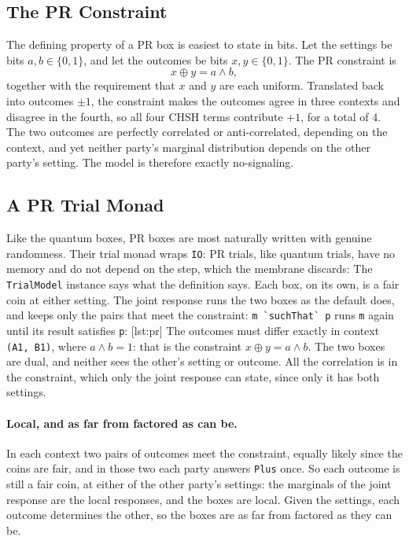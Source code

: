 \documentclass[11pt]{article}
\newcommand{\hs}{\lstinline[style=hask,basicstyle=\ttfamily,frame=none]}
\begin{document}
\subsection{The PR Constraint}

The defining property of a PR box is easiest to state in bits. Let the settings be bits $a, b \in \{0, 1\}$, and let the outcomes be bits $x, y \in \{0, 1\}$. The PR constraint is
\[
  x \oplus y = a \land b,
\]
together with the requirement that $x$ and $y$ are each uniform. Translated back into outcomes $\pm1$, the constraint makes the outcomes agree in three contexts and disagree in the fourth, so all four CHSH terms contribute $+1$, for a total of $4$. The two outcomes are perfectly correlated or anti-correlated, depending on the context, and yet neither party's marginal distribution depends on the other party's setting. The model is therefore exactly no-signaling.

\subsection{A PR Trial Monad}

Like the quantum boxes, PR boxes are most naturally written with genuine randomness. Their trial monad wraps \hs|IO|:
PR trials, like quantum trials, have no memory and do not depend on the step, which the membrane discards:
The \hs|TrialModel| instance says what the definition says. Each box, on its own, is a fair coin at either setting. The joint response runs the two boxes as the default does, and keeps only the pairs that meet the constraint: \hs|m `suchThat` p| runs \hs|m| again until its result satisfies \hs|p|:
[lst:pr]
The outcomes must differ exactly in context \hs|(A1, B1)|, where $a \land b = 1$: that is the constraint $x \oplus y = a \land b$. The two boxes are dual, and neither sees the other's setting or outcome. All the correlation is in the constraint, which only the joint response can state, since only it has both settings.

\paragraph{Local, and as far from factored as can be.} In each context two pairs of outcomes meet the constraint, equally likely since the coins are fair, and in those two each party answers \hs|Plus| once. So each outcome is still a fair coin, at either of the other party's settings: the marginals of the joint response are the local responses, and the boxes are local. Given the settings, each outcome determines the other, so the boxes are as far from factored as they can be.
\end{document}
